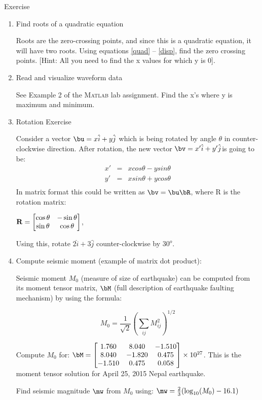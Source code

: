 \documentclass[11pt,titlepage,fleqn]{article}
\newcommand{\matlab}{\textsc{Matlab}\xspace}
\begin{document}
\begin{section}{Exercise}
\begin{enumerate}
\item Find roots of a quadratic equation

Roots are the zero-crossing points, and since this is a quadratic equation, it will have two roots.  Using equations \ref{quad} -- \ref{disp}, find the zero crossing points. [Hint: All you need to find the x values for which y is 0].

\item Read and visualize waveform data

See Example 2 of the \matlab lab assignment. Find the x's where y is maximum and minimum.

\item Rotation Exercise

Consider a vector $\bu = x \hat{i} + y \hat{j}$ which is being rotated by angle $\theta$ in counter-clockwise direction. After rotation, the new vector $\bv = x' \hat{i} + y' \hat{j}$is going to be: 
\begin{eqnarray*}
x' &=& x cos \theta - y sin \theta \\
y' &=& x sin \theta + y cos \theta \\
\end{eqnarray*}
In matrix format this could be written as $\bv = \bu \bR$, where R is the rotation matrix:

${\bf R} =
\begin{bmatrix} 
\cos \theta & -\sin \theta \\
\sin \theta & \cos \theta
\end{bmatrix}$,

Using this, rotate $2 \hat{i} + 3 \hat{j}$ counter-clockwise by $30^o$.

\item Compute seismic moment (example of matrix dot product):

Seismic moment $M_0$ (measure of size of earthquake) can be computed from its moment tensor matrix, $\bM$ (full description of earthquake faulting mechanism) by using the formula:

\begin{equation}
M_0 = \frac{1}{\sqrt{2}} \left( \sum_{ij} M_{ij}^2 \right ) ^{1/2}
\end{equation}

Compute $M_0$ for:
${\bM} =
\begin{bmatrix} 
1.760 & 8.040 & -1.510\\
8.040 & -1.820 & 0.475\\
-1.510  & 0.475 & 0.058 
\end{bmatrix} \times 10^{27}$. This is the moment tensor solution for April 25, 2015 Nepal earthquake.

Find seismic magnitude $\mw$ from $M_0$ using: $ \mw = \frac{2}{3} (\log_{10}(M_0) -16.1)$




\end{enumerate}
\end{section}
\end{document}
